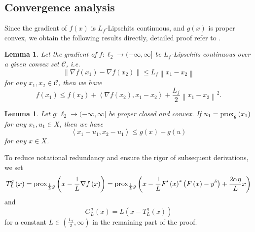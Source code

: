 \documentclass[a4paper,12pt]{article}
\newtheorem{lemma}[theorem]{Lemma}
\numberwithin{equation}{section}
\begin{document}
\subsection{Convergence analysis}

\par Since the gradient of $f\left(x\right)$ is $L_{f}$-Lipschits continuous, and $g\left(x\right)$ is proper convex, we obtain the following results directly, detailed proof refer to \cite[Lemma 5.7 and Theorem 6.39]{B17}.

\begin{lemma}\label{lem4.6}
    Let the gradient of $f:\ell_{2}\rightarrow (-\infty,\infty]$ be $L_{f}$-Lipschits continuous over a given convex set $\mathcal{C}$, i.e.
    \begin{equation}\label{equ4.11}
        \left\|\nabla f\left(x_{1}\right)-\nabla f\left(x_{2}\right)\right\|\leq L_{f}\left\|x_{1}-x_{2}\right\|
    \end{equation}
    for any $x_{1},x_{2}\in\mathcal{C}$, then we have
    \begin{equation}\label{equ4.12}
        f\left(x_{1}\right)\leq f\left(x_{2}\right)+\left< \nabla f\left(x_{2}\right),x_{1}-x_{2}\right>+ \frac{L_{f}}{2}\left\|x_{1}-x_{2}\right\|^{2}.
    \end{equation}
\end{lemma}

\begin{lemma}\label{lem4.9}
    Let $g: \ell_{2} \rightarrow (-\infty,\infty]$ be proper closed and convex. If $u_{1}={\rm prox}_{g}\left(x_{1}\right)$ for any $x_{1},u_{1}\in X$, then we have
    \begin{equation}\label{equ4.14}
        \left<x_{1}-u_{1}, x_{2}-u_{1}\right>\leq g\left(x\right)- g\left(u\right)
    \end{equation}
    for any $x\in X$.
\end{lemma}

\par To reduce notational redundancy and ensure the rigor of subsequent derivations, we set 
\begin{equation*} 
    T_{L}^{g}\left(x\right)={\rm prox}_{\frac{1}{L}g}\left(x-\frac{1}{L}\nabla f\left(x\right)\right)={\rm prox}_{\frac{1}{L}g}\left(x- \frac{1}{L}F'\left(x\right)^{*}\left(F\left(x\right)- y^{\delta}\right)+ \frac{2\alpha\eta}{L} x\right)
\end{equation*}
and 
\begin{equation*} 
    G_{L}^{g}\left(x\right)=L\left(x-T_{L}^{g}\left(x\right)\right)
\end{equation*}
for a constant $L\in \left(\frac{L_{f}}{2},\infty\right)$ in the remaining part of the proof. 
\end{document}
